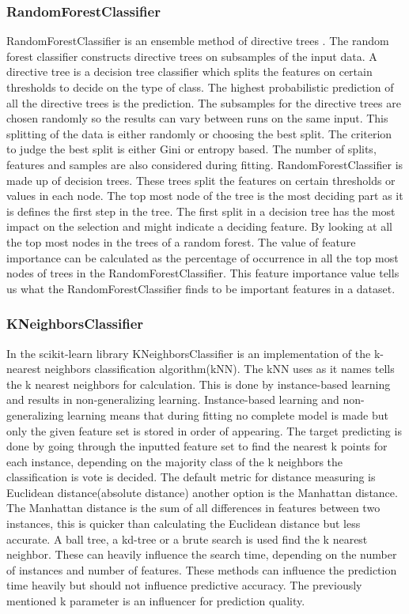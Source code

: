 \documentclass[a4paper,10pt]{article}
\begin{document}
\subsubsection{RandomForestClassifier}
RandomForestClassifier is an ensemble method of directive trees \cite{RDF}. The random forest classifier constructs directive trees on subsamples of the input data.  A directive tree is a decision tree classifier which splits the features on certain thresholds to decide on the type of class. The highest probabilistic prediction of all the directive trees is the prediction. The subsamples for the directive trees are chosen randomly so the results can vary between runs on the same input. This splitting of the data is either randomly or choosing the best split. The criterion to judge the best split is either Gini or entropy based. The number of splits, features and samples are also considered during fitting. 
RandomForestClassifier is made up of decision trees. These trees split the features on certain thresholds or values in each node. The top most node of the tree is the most deciding part as it is defines the first step in the tree. The first split in a decision tree has the most impact on the selection and might indicate a deciding feature. By looking at all the top most nodes in the trees of a random forest. The value of feature importance can be calculated as the percentage of occurrence in all the top most nodes of trees in the RandomForestClassifier. This feature importance value tells us what the RandomForestClassifier finds to be important features in a dataset.


\subsubsection{KNeighborsClassifier}
In the scikit-learn library KNeighborsClassifier is an implementation of the k-nearest neighbors classification algorithm(kNN)\cite{KNN}. The kNN uses as it names tells the k nearest neighbors for calculation. This is done by instance-based learning and results in non-generalizing learning. Instance-based learning and non-generalizing learning means that during fitting no complete model is made but only the given feature set is stored in order of appearing. The target predicting is done by going through the inputted feature set to find the nearest k points for each instance, depending on the majority class of the k neighbors the classification is vote is decided. The default metric for distance measuring is Euclidean distance(absolute distance) another option is the Manhattan distance. The Manhattan distance is the sum of all differences in features between two instances, this is quicker than calculating the Euclidean distance but less accurate. A ball tree, a kd-tree or a brute search is used find the k nearest neighbor. These can heavily influence the search time, depending on the number of instances and number of features. These methods can influence the prediction time heavily but should not influence predictive accuracy. The previously mentioned k parameter is an influencer for prediction quality.\cite{KNN-k}
\end{document}
